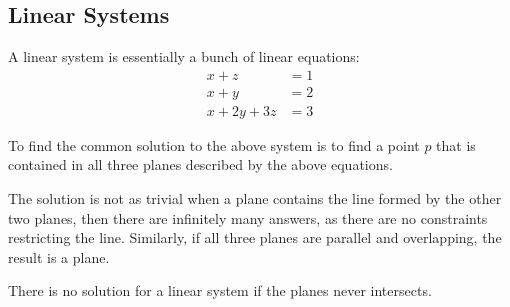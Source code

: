 \documentclass[12pt]{article}
\theoremstyle{definition}
\begin{document}
	\subsection{Linear Systems}
	
	A linear system is essentially a bunch of linear equations:
	\begin{align*}
		x + z &= 1 \\
		x + y &= 2 \\
		x + 2y + 3z &= 3
	\end{align*}
	
	To find the common solution to the above system is to find a point $p$ that is contained in all three planes described by the above equations.
	
	The solution is not as trivial when a plane contains the line formed by the other two planes, then there are infinitely many answers, as there are no constraints restricting the line. Similarly, if all three planes are parallel and overlapping, the result is a plane.
	
	There is no solution for a linear system if the planes never intersects.
	
	
	
\end{document}
